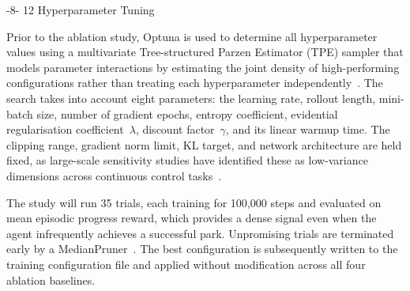 \documentclass{sig-alternate}
\makeatletter
\renewcommand\subsection{\@startsection{subsection}{2}{\z@}%
    {-8\p@ \@plus -2\p@ \@minus -\p@}%
    {12\p@}%
    {\secfnt}}
\makeatother
\begin{document}

\subsection{Hyperparameter Tuning}

Prior to the ablation study, Optuna is used to determine all hyperparameter values using a multivariate Tree-structured Parzen Estimator (TPE) sampler that models parameter interactions by estimating the joint density of high-performing configurations rather than treating each hyperparameter  independently~\cite{akiba2019optuna}. The search takes into account eight parameters: the learning rate, rollout length, mini-batch size, number of gradient epochs, entropy coefficient, evidential regularisation coefficient~$\lambda$, discount factor~$\gamma$, and its linear warmup time. The clipping range, gradient norm limit, KL target, and network architecture are held fixed, as large-scale sensitivity studies have identified these as low-variance dimensions across continuous control tasks~\cite{andrychowicz2021onpolicy}.

The study will run 35 trials, each training for 100{,}000 steps and evaluated on mean episodic progress reward, which provides a dense signal even when the agent infrequently achieves a successful park. Unpromising trials are terminated early by a MedianPruner~\cite{eimer2023hyperparams}. The best configuration is subsequently written to the training configuration file and applied without modification across all four ablation baselines.


\end{document}
